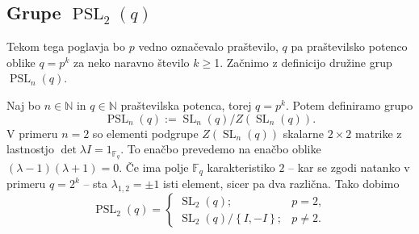 




\subsection{Grupe $\operatorname{PSL}_{2}(q)$}\label{sec_grupe_psl2q}

Tekom tega poglavja bo $p$ vedno označevalo praštevilo, $q$ pa praštevilsko potenco oblike $q = p^{k}$ za neko naravno število $k \ge $1. Začnimo z definicijo družine grup $\operatorname{PSL}_n(q)$.

\begin{definicija}\label{def_pslnq_in_psl2q}
    Naj bo $n \in \mathbb{N}$ in $q \in \mathbb{N}$ praštevilska potenca, torej $q = p^{k}$. Potem definiramo grupo \begin{equation*}
        \operatorname{PSL}_n(q) := {\operatorname{SL}_n(q)} / {Z(\operatorname{SL}_n(q))}.
     \end{equation*}   
    V primeru $n = 2$ so elementi podgrupe $Z(\operatorname{SL}_n(q))$ skalarne $2 \times 2$ matrike z lastnostjo $\det \lambda I = 1_{\mathbb{F}_q}$. To enačbo prevedemo na enačbo oblike $(\lambda - 1)(\lambda + 1) = 0$.
    Če ima polje $\mathbb{F}_q$ karakteristiko $2$ -- kar se zgodi natanko v primeru $q = 2^{k}$ -- sta $\lambda_{1,2} = \pm 1$ isti element, sicer pa dva različna. Tako dobimo
    \begin{equation*}
                \operatorname{PSL}_2(q) = \begin{cases}
                    \operatorname{SL}_2(q); & p = 2,  \\
                    {\operatorname{SL}_2(q)} / {\left\{ I, -I \right\} }; & p \neq 2.
                \end{cases}
             \end{equation*}   
    \end{definicija}
    
